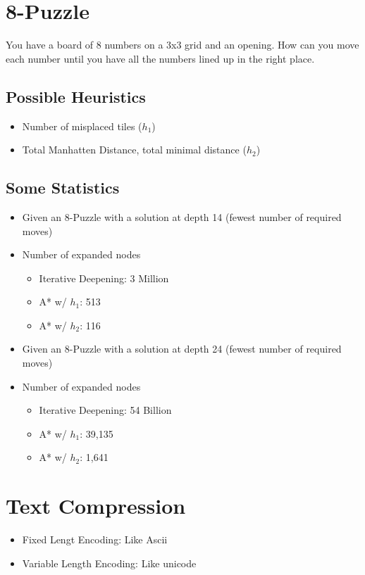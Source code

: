 \documentclass{article}
\begin{document}
\section{8-Puzzle}
\label{sec:org17bff33}
You have a board of 8 numbers on a 3x3 grid and an opening. How can you move each number until you have all the numbers lined up in the right place.
\subsection{Possible Heuristics}
\label{sec:orgde65de5}
\begin{itemize}
\item Number of misplaced tiles (\(h_1\))
\item Total Manhatten Distance, total minimal distance (\(h_2\))
\end{itemize}

\subsection{Some Statistics}
\label{sec:orgba69eae}
\begin{itemize}
\item Given an 8-Puzzle with a solution at depth 14 (fewest number of required moves)
\item Number of expanded nodes
\begin{itemize}
\item Iterative Deepening: 3 Million
\item A* w/ \(h_1\): 513
\item A* w/ \(h_2\): 116
\end{itemize}

\item Given an 8-Puzzle with a solution at depth 24 (fewest number of required moves)
\item Number of expanded nodes
\begin{itemize}
\item Iterative Deepening: 54 Billion
\item A* w/ \(h_1\): 39,135
\item A* w/ \(h_2\): 1,641
\end{itemize}
\end{itemize}

\section{Text Compression}
\label{sec:orge616edf}
\begin{itemize}
\item Fixed Lengt Encoding: Like Ascii
\item Variable Length Encoding: Like unicode
\end{itemize}
\end{document}

